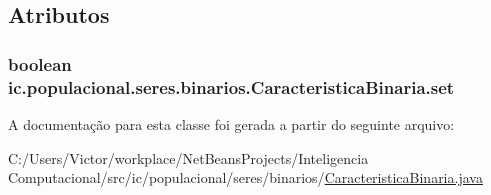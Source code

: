 \subsection{Atributos}
\hypertarget{classic_1_1populacional_1_1seres_1_1binarios_1_1_caracteristica_binaria_a681ee9eb0af3a4e8dfc2f5534602f558}{
\subsubsection[{set}]{\setlength{\rightskip}{0pt plus 5cm}boolean ic.\-populacional.\-seres.\-binarios.\-Caracteristica\-Binaria.\-set\hspace{0.3cm}{\ttfamily [private]}}}\label{classic_1_1populacional_1_1seres_1_1binarios_1_1_caracteristica_binaria_a681ee9eb0af3a4e8dfc2f5534602f558}


A documentação para esta classe foi gerada a partir do seguinte arquivo\-:\begin{DoxyCompactItemize}
\item 
C\-:/\-Users/\-Victor/workplace/\-Net\-Beans\-Projects/\-Inteligencia Computacional/src/ic/populacional/seres/binarios/\hyperlink{_caracteristica_binaria_8java}{Caracteristica\-Binaria.\-java}\end{DoxyCompactItemize}
